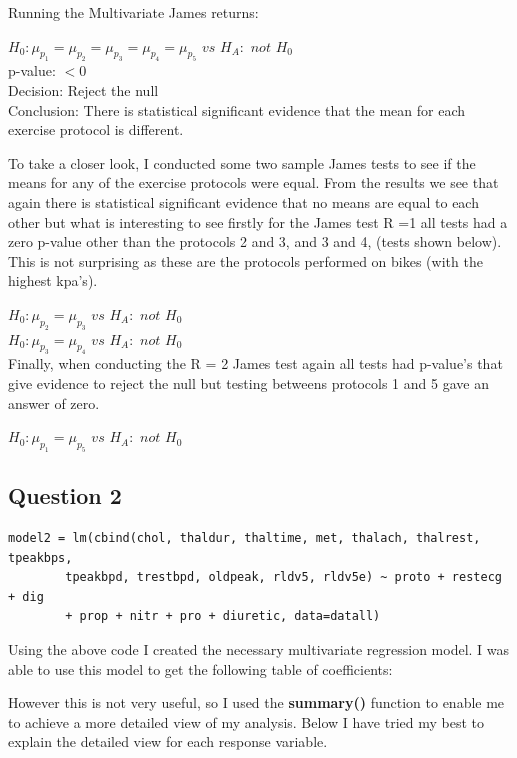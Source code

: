 \documentclass[a4paper]{article}
\begin{document}
Running the Multivariate James returns:

$H_0 : \mu_{p_1} = \mu_{p_2} = \mu_{p_3} = \mu_{p_4}  = \mu_{p_5}$ $vs$ $H_A :$ $not$ $H_0$\\
p-value: $< \num{0}$\\
Decision: Reject the null\\
Conclusion: There is statistical significant evidence that the mean for each exercise protocol is different.\\
\newpage

To take a closer look, I conducted some two sample James tests to see if the means for any of the exercise protocols were equal. 
From the results we see that again there is statistical significant evidence that no means are equal to each other but what is interesting to see firstly for the James test R =1 all tests had a zero p-value other than the protocols 2 and 3, and 3 and 4, (tests shown below). This is not surprising as these are the protocols performed on bikes (with the highest kpa's). 

$H_0 : \mu_{p_2} = \mu_{p_3}$ $vs$ $H_A :$ $not$ $H_0$\\



$H_0 : \mu_{p_3} = \mu_{p_4}$ $vs$ $H_A :$ $not$ $H_0$\\

Finally, when conducting the R = 2 James test again all tests had p-value's that give evidence to reject the null but testing betweens protocols 1 and 5 gave an answer of zero.

$H_0 : \mu_{p_1} = \mu_{p_5}$ $vs$ $H_A :$ $not$ $H_0$\\

\newpage
\subsection{Question 2}

\begin{lstlisting}[frame=single]
model2 = lm(cbind(chol, thaldur, thaltime, met, thalach, thalrest, tpeakbps,
		tpeakbpd, trestbpd, oldpeak, rldv5, rldv5e) ~ proto + restecg + dig
		+ prop + nitr + pro + diuretic, data=datall)
\end{lstlisting}

Using the above code I created the necessary multivariate regression model.
I was able to use this model to get the following table of coefficients:

However this is not very useful, so I used the \textbf{summary()} function to
enable me to achieve a more detailed view of my analysis. Below I have tried
my best to explain the detailed view for each response variable.
\end{document}
